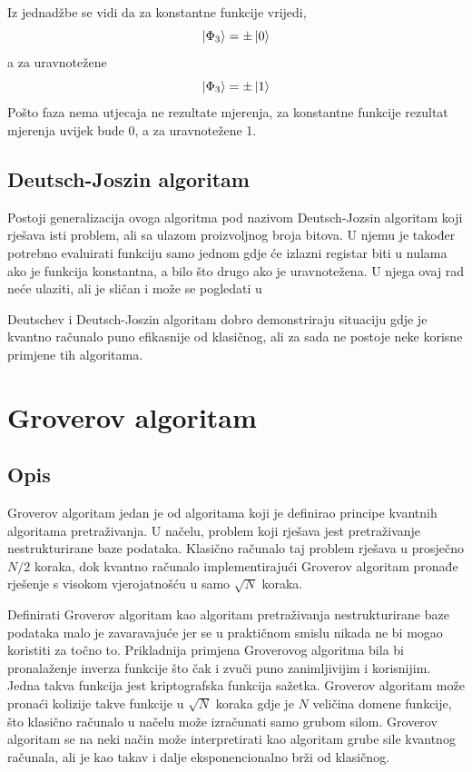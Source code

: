 Iz jednadžbe se vidi da za konstantne funkcije vrijedi,
\begin{equation}
\ket{\Phi_3} = \pm\ket{0}
\end{equation}
a za uravnotežene
\begin{equation}
\ket{\Phi_3} = \pm\ket{1}
\end{equation}
Pošto faza nema utjecaja ne rezultate mjerenja, za konstantne funkcije rezultat mjerenja uvijek bude 0, a za uravnotežene 1.

\subsection{Deutsch-Joszin algoritam}

Postoji generalizacija ovoga algoritma pod nazivom Deutsch-Jozsin algoritam koji rješava isti problem, ali sa ulazom proizvoljnog broja bitova. U njemu je također potrebno evaluirati funkciju samo jednom gdje će izlazni registar biti u nulama ako je funkcija konstantna, a bilo što drugo ako je uravnotežena. U njega ovaj rad neće ulaziti, ali je sličan i može se pogledati u \citep{nielsen2010quantum}

Deutschev i Deutsch-Joszin algoritam dobro demonstriraju situaciju gdje je kvantno računalo puno efikasnije od klasičnog, ali za sada ne postoje neke korisne primjene tih algoritama.

\section{Groverov algoritam}

\subsection{Opis}
Groverov algoritam\citep{grover} jedan je od algoritama koji je definirao principe kvantnih algoritama pretraživanja. U načelu, problem koji rješava jest pretraživanje nestrukturirane baze podataka. Klasično računalo taj problem rješava u prosječno $N/2$ koraka, dok kvantno računalo implementirajući Groverov algoritam pronađe rješenje s visokom vjerojatnošću u samo $\sqrt{N}$ koraka.

Definirati Groverov algoritam kao algoritam pretraživanja nestrukturirane baze podataka malo je zavaravajuće jer se u praktičnom smislu nikada ne bi mogao koristiti za točno to. Prikladnija primjena Groverovog algoritma bila bi pronalaženje inverza funkcije što čak i zvuči puno zanimljivijim i korisnijim. Jedna takva funkcija jest kriptografska funkcija sažetka. Groverov algoritam može pronaći kolizije takve funkcije u $\sqrt{N}$ koraka gdje je $N$ veličina domene funkcije, što klasično računalo u načelu može izračunati samo grubom silom. Groverov algoritam se na neki način može interpretirati kao algoritam grube sile kvantnog računala, ali je kao takav i dalje eksponencionalno brži od klasičnog.

